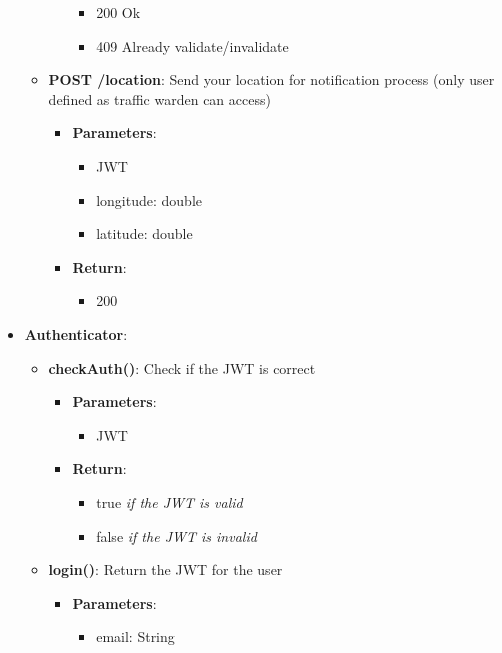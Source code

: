 \documentclass{article}
\begin{document}
\begin{itemize}
\begin{itemize}
\begin{itemize}
						\begin{itemize}
							\item 200 Ok
							\item 409 Already validate/invalidate
						\end{itemize}
				\end{itemize}
			\item \textbf{POST /location}:
				Send your location for notification process (only user defined as traffic warden can access)
				\begin{itemize}
					\item \textbf{Parameters}:
						\begin{itemize}
							\item JWT
							\item longitude: double
							\item latitude: double
						\end{itemize}
					\item \textbf{Return}:
						\begin{itemize}
							\item 200
						\end{itemize}
				\end{itemize}
		\end{itemize}
	\item \textbf{Authenticator}:
		\begin{itemize}
			\item \textbf{checkAuth()}:
				Check if the JWT is correct
				\begin{itemize}
					\item \textbf{Parameters}:
						\begin{itemize}
							\item JWT
						\end{itemize}
					\item \textbf{Return}:
						\begin{itemize}
							\item true \textit{if the JWT is valid}
							\item false \textit{if the JWT is invalid}
						\end{itemize}
				\end{itemize}
			\item \textbf{login()}:
				Return the JWT for the user
				\begin{itemize}
					\item \textbf{Parameters}:
						\begin{itemize}
							\item email: String

\end{itemize}
\end{itemize}
\end{itemize}
\end{itemize}
\end{document}
